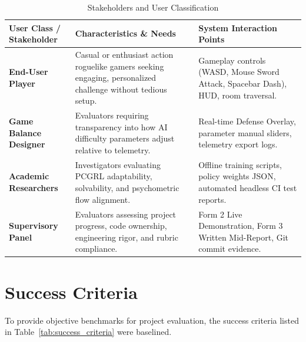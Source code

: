 \begin{table}[!htbp]
\centering
\caption{Stakeholders and User Classification}
\label{tab:stakeholders}
\small
\begin{tabular}{p{}p{}p{}}
\toprule
\textbf{User Class / Stakeholder} & \textbf{Characteristics \& Needs} & \textbf{System Interaction Points} \\
\midrule
\textbf{End-User Player} & Casual or enthusiast action roguelike gamers seeking engaging, personalized challenge without tedious setup. & Gameplay controls (WASD, Mouse Sword Attack, Spacebar Dash), HUD, room traversal. \\
\textbf{Game Balance Designer} & Evaluators requiring transparency into how AI difficulty parameters adjust relative to telemetry. & Real-time Defense Overlay, parameter manual sliders, telemetry export logs. \\
\textbf{Academic Researchers} & Investigators evaluating PCGRL adaptability, solvability, and psychometric flow alignment. & Offline training scripts, policy weights JSON, automated headless CI test reports. \\
\textbf{Supervisory Panel} & Evaluators assessing project progress, code ownership, engineering rigor, and rubric compliance. & Form 2 Live Demonstration, Form 3 Written Mid-Report, Git commit evidence. \\
\bottomrule
\end{tabular}
\end{table}

\section{Success Criteria}
To provide objective benchmarks for project evaluation, the success criteria listed in Table~\ref{tab:success_criteria} were baselined.

